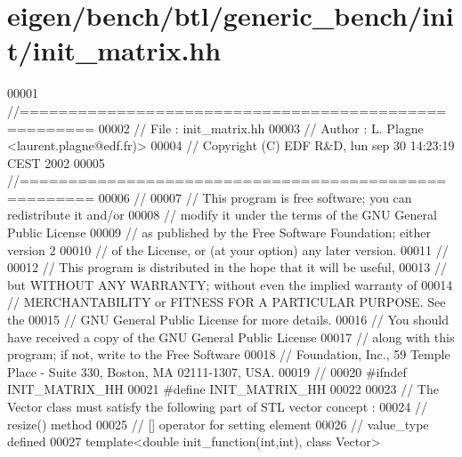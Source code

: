 \hypertarget{eigen_2bench_2btl_2generic__bench_2init_2init__matrix_8hh_source}{}\section{eigen/bench/btl/generic\+\_\+bench/init/init\+\_\+matrix.hh}
\label{eigen_2bench_2btl_2generic__bench_2init_2init__matrix_8hh_source}

\begin{DoxyCode}
00001 \textcolor{comment}{//=====================================================}
00002 \textcolor{comment}{// File   :  init\_matrix.hh}
00003 \textcolor{comment}{// Author :  L. Plagne <laurent.plagne@edf.fr)>}
00004 \textcolor{comment}{// Copyright (C) EDF R&D,  lun sep 30 14:23:19 CEST 2002}
00005 \textcolor{comment}{//=====================================================}
00006 \textcolor{comment}{//}
00007 \textcolor{comment}{// This program is free software; you can redistribute it and/or}
00008 \textcolor{comment}{// modify it under the terms of the GNU General Public License}
00009 \textcolor{comment}{// as published by the Free Software Foundation; either version 2}
00010 \textcolor{comment}{// of the License, or (at your option) any later version.}
00011 \textcolor{comment}{//}
00012 \textcolor{comment}{// This program is distributed in the hope that it will be useful,}
00013 \textcolor{comment}{// but WITHOUT ANY WARRANTY; without even the implied warranty of}
00014 \textcolor{comment}{// MERCHANTABILITY or FITNESS FOR A PARTICULAR PURPOSE.  See the}
00015 \textcolor{comment}{// GNU General Public License for more details.}
00016 \textcolor{comment}{// You should have received a copy of the GNU General Public License}
00017 \textcolor{comment}{// along with this program; if not, write to the Free Software}
00018 \textcolor{comment}{// Foundation, Inc., 59 Temple Place - Suite 330, Boston, MA  02111-1307, USA.}
00019 \textcolor{comment}{//}
00020 \textcolor{preprocessor}{#ifndef INIT\_MATRIX\_HH}
00021 \textcolor{preprocessor}{#define INIT\_MATRIX\_HH}
00022 
00023 \textcolor{comment}{// The Vector class must satisfy the following part of STL vector concept :}
00024 \textcolor{comment}{//            resize() method}
00025 \textcolor{comment}{//            [] operator for setting element}
00026 \textcolor{comment}{//            value\_type defined}
00027 \textcolor{keyword}{template}<\textcolor{keywordtype}{double} init\_function(\textcolor{keywordtype}{int},\textcolor{keywordtype}{int}), \textcolor{keyword}{class} Vector>

\end{DoxyCode}

